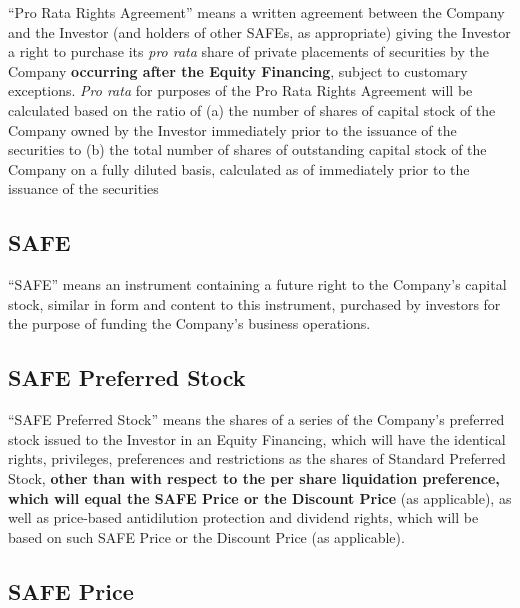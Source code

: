 \documentclass[12pt,letterpaper,fullpage]{article}
\begin{document}
\begin{sloppypar}
“Pro Rata Rights Agreement” means a written agreement between the
Company and the Investor (and holders of other SAFEs, as appropriate)
giving the Investor a right to purchase its \emph{pro rata} share of
private placements of securities by the Company \textbf{occurring
after the Equity Financing}, subject to customary exceptions.
\emph{Pro rata} for purposes of the Pro Rata Rights Agreement will be
calculated based on the ratio of (a) the number of shares of capital
stock of the Company owned by the Investor immediately prior to the
issuance of the securities to (b) the total number of shares of
outstanding capital stock of the Company on a fully diluted basis,
calculated as of immediately prior to the issuance of the securities
\end{sloppypar}

\subsection{SAFE}
\label{sec:safedef}

\begin{sloppypar}
“SAFE” means an instrument containing a future right to the Company’s
capital stock, similar in form and content to this instrument,
purchased by investors for the purpose of funding the Company’s
business operations.
\end{sloppypar}

\subsection{SAFE Preferred Stock}
\label{sec:safepreferredstock}

“SAFE Preferred Stock” means the shares of a series of the Company’s
preferred stock issued to the Investor in an Equity Financing, which
will have the identical rights, privileges, preferences and
restrictions as the shares of Standard Preferred Stock,\textbf{ other than
with respect to the per share liquidation preference, which will equal
the SAFE Price or the Discount Price} (as applicable), as well as
price-based antidilution protection and dividend rights, which will be
based on such SAFE Price or the Discount Price (as applicable).

\subsection{SAFE Price}
\label{sec:safeprice}
\end{document}
